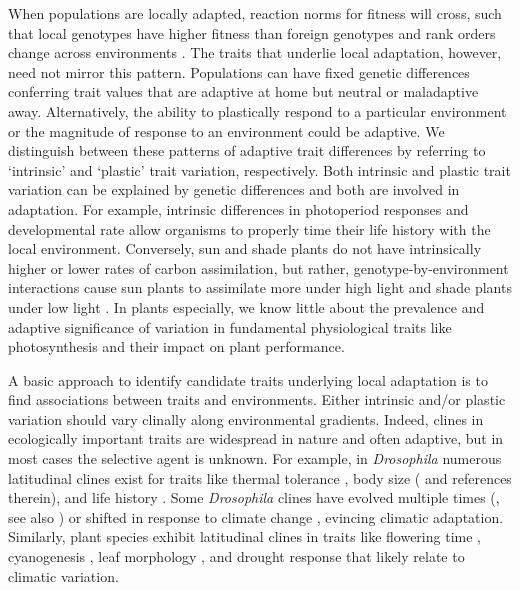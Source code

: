 \documentclass[11pt, oneside]{article}
\begin{document}
When populations are locally adapted, reaction norms for fitness will cross, such that local genotypes have higher fitness than foreign genotypes and rank orders change across environments \citep{Kawecki_Ebert_2004}. The traits that underlie local adaptation, however, need not mirror this pattern. Populations can have fixed genetic differences conferring trait values that are adaptive at home but neutral or maladaptive away. Alternatively, the ability to plastically respond to a particular environment or the magnitude of response to an environment could be adaptive. We distinguish between these patterns of adaptive trait differences by referring to `intrinsic' and `plastic' trait variation, respectively. Both intrinsic and plastic trait variation can be explained by genetic differences and both are involved in adaptation. For example, intrinsic differences in photoperiod responses \citep{Blackman_etal_2011} and developmental rate \citep{Stinchcombe_etal_2004} allow organisms to properly time their life history with the local environment. Conversely, sun and shade plants do not have intrinsically higher or lower rates of carbon assimilation, but rather, genotype-by-environment interactions cause sun plants to assimilate more under high light and shade plants under low light \citep{Givnish_1988}. In plants especially, we know little about the prevalence and adaptive significance of variation in fundamental physiological traits like photosynthesis and their impact on plant performance.

A basic approach to identify candidate traits underlying local adaptation is to find associations between traits and environments. Either intrinsic and/or plastic variation should vary clinally along environmental gradients. Indeed, clines in ecologically important traits are widespread in nature \citep{Endler_1977} and often adaptive, but in most cases the selective agent is unknown. For example, in \textit{Drosophila} numerous latitudinal clines exist for traits like thermal tolerance \citep{Hoffmann_etal_2002}, body size (\cite{Coyne_Beecham_1987} and references therein), and life history \citep{Schmidt_etal_2005}. Some \textit{Drosophila} clines have evolved multiple times (\cite{Oakeshott_etal_1982, Huey_etal_2000}, see also \cite{Bradshaw_Holzapfel_2001}) or shifted in response to climate change \citep{Umina_etal_2005}, evincing climatic adaptation. Similarly, plant species exhibit latitudinal clines in traits like flowering time \citep{Stinchcombe_etal_2004}, cyanogenesis \citep{Kooyers_Olsen_2012}, leaf morphology \citep{Hopkins_etal_2008, Stock_etal_2014}, and drought response \citep{Kooyers_etal_2015} that likely relate to climatic variation. 
\end{document}
